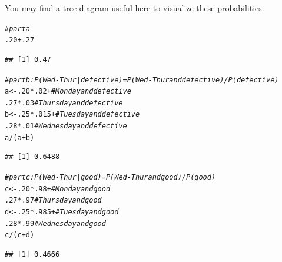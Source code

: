 \documentclass[twoside]{book}\usepackage[]{graphicx}\usepackage[]{xcolor}
\makeatletter
\newcommand{\hlnum}[1]{\textcolor[rgb]{0.686,0.059,0.569}{#1}}%
\newcommand{\hlcom}[1]{\textcolor[rgb]{0.678,0.584,0.686}{\textit{#1}}}%
\newcommand{\hlopt}[1]{\textcolor[rgb]{0,0,0}{#1}}%
\newcommand{\hlstd}[1]{\textcolor[rgb]{0.345,0.345,0.345}{#1}}%
\newcommand{\hlkwb}[1]{\textcolor[rgb]{0.69,0.353,0.396}{#1}}%
\newenvironment{kframe}{%
 \def\at@end@of@kframe{}%
 \ifinner\ifhmode%
  \def\at@end@of@kframe{\end{minipage}}%
  \begin{minipage}{\columnwidth}%
 \fi\fi%
 \def\FrameCommand##1{\hskip\@totalleftmargin \hskip-\fboxsep
 \colorbox{shadecolor}{##1}\hskip-\fboxsep
     \hskip-\linewidth \hskip-\@totalleftmargin \hskip\columnwidth}%
 \MakeFramed {\advance\hsize-\width
   \@totalleftmargin\z@ \linewidth\hsize
   \@setminipage}}%
 {\par\unskip\endMakeFramed%
 \at@end@of@kframe}
\newenvironment{knitrout}{}{} %
\makeatother
\begin{document}
\begin{solution}
You may find a tree diagram useful here to visualize these probabilities.
\begin{knitrout}
\color{fgcolor}\begin{kframe}
\begin{alltt}
\hlcom{# part a}
\hlnum{.20} \hlopt{+} \hlnum{.27}
\end{alltt}
\begin{verbatim}
## [1] 0.47
\end{verbatim}
\begin{alltt}
\hlcom{# part b: P( Wed-Thur | defective ) = P( Wed-Thur and defective ) / P(defective)}
\hlstd{a} \hlkwb{<-} \hlnum{.20} \hlopt{*} \hlnum{.02} \hlopt{+}       \hlcom{# Monday and defective}
     \hlnum{.27} \hlopt{*} \hlnum{.03}         \hlcom{# Thursday and defective}
\hlstd{b} \hlkwb{<-} \hlnum{.25} \hlopt{*} \hlnum{.015} \hlopt{+}      \hlcom{# Tuesday and defective}
     \hlnum{.28} \hlopt{*} \hlnum{.01}         \hlcom{# Wednesday and defective }
\hlstd{a} \hlopt{/} \hlstd{(a} \hlopt{+} \hlstd{b)}
\end{alltt}
\begin{verbatim}
## [1] 0.6488
\end{verbatim}
\begin{alltt}
\hlcom{# part c: P( Wed-Thur | good ) = P( Wed-Thur and good ) / P(good)}
\hlstd{c} \hlkwb{<-} \hlnum{.20} \hlopt{*} \hlnum{.98} \hlopt{+}       \hlcom{# Monday and good}
     \hlnum{.27} \hlopt{*} \hlnum{.97}         \hlcom{# Thursday and good}
\hlstd{d} \hlkwb{<-} \hlnum{.25} \hlopt{*} \hlnum{.985} \hlopt{+}      \hlcom{# Tuesday and good}
     \hlnum{.28} \hlopt{*} \hlnum{.99}         \hlcom{# Wednesday and good }
\hlstd{c} \hlopt{/} \hlstd{(c} \hlopt{+} \hlstd{d)}
\end{alltt}
\begin{verbatim}
## [1] 0.4666
\end{verbatim}
\end{kframe}
\end{knitrout}
\end{solution}

% 
\end{document}
